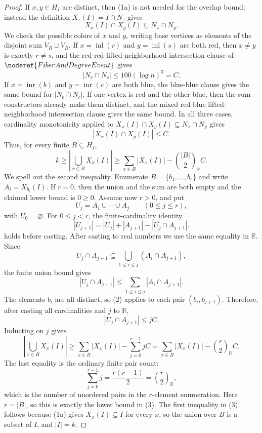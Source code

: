 \begin{proof}
If \(x,y\in H_I\) are distinct, then (1a) is not needed for the overlap
bound; instead the definition \(X_z(I)=I\cap N_z\) gives
\[
X_x(I)\cap X_y(I)\subseteq N_x\cap N_y.
\]
We check the possible colors of \(x\) and \(y\), writing base vertices as
elements of the disjoint sum \(V_R\sqcup V_B\).  If
\(x=\operatorname{inl}(r)\) and \(y=\operatorname{inl}(s)\) are both red, then
\(x\ne y\) is exactly \(r\ne s\), and the red-red lifted-neighborhood
intersection clause of \(\noderef{FiberAndDegreeEvent}\) gives
\[
|N_r\cap N_s|\le 100(\log n)^3=C.
\]
If \(x=\operatorname{inr}(b)\) and \(y=\operatorname{inr}(c)\) are both blue,
the blue-blue clause gives the same bound for \(|N_b\cap N_c|\).  If one
vertex is red and the other blue, then the sum constructors already make them
distinct, and the mixed red-blue lifted-neighborhood intersection clause gives
the same bound.  In all three cases, cardinality monotonicity applied to
\(X_x(I)\cap X_y(I)\subseteq N_x\cap N_y\) gives
\[
|X_x(I)\cap X_y(I)|\le C. \tag{2}
\]
Thus, for every finite \(B\subseteq H_I\),
\[
k\ge\left|\bigcup_{x\in B}X_x(I)\right|
\ge \sum_{x\in B}|X_x(I)|
  -\binom{|B|}{2}_{\mathbb R}C. \tag{3}
\]
We spell out the second inequality.  Enumerate \(B=\{b_1,\ldots,b_r\}\) and
write \(A_i=X_{b_i}(I)\).  If \(r=0\), then the union and the sum are both
empty and the claimed lower bound is \(0\ge0\).  Assume now \(r>0\), and put
\[
U_j=A_1\cup\cdots\cup A_j\qquad (0\le j\le r),
\]
with \(U_0=\varnothing\).  For \(0\le j<r\), the finite-cardinality identity
\[
|U_{j+1}|=|U_j|+|A_{j+1}|-|U_j\cap A_{j+1}|.
\]
holds before casting.  After casting to real numbers we use the same equality
in \(\mathbb R\).  Since
\[
U_j\cap A_{j+1}\subseteq
\bigcup_{1\le i\le j}(A_i\cap A_{j+1}),
\]
the finite union bound gives
\[
|U_j\cap A_{j+1}|
\le\sum_{1\le i\le j}|A_i\cap A_{j+1}|.
\]
The elements \(b_i\) are all distinct, so (2) applies to each pair
\((b_i,b_{j+1})\).  Therefore, after casting all cardinalities and \(j\) to
\(\mathbb R\),
\[
|U_j\cap A_{j+1}|
\le jC.
\]
Inducting on \(j\) gives
\[
\left|\bigcup_{x\in B}X_x(I)\right|
\ge
\sum_{x\in B}|X_x(I)|
-
\sum_{j=0}^{r-1} jC
=
\sum_{x\in B}|X_x(I)|
-\binom r2_{\mathbb R}C.
\]
The last equality is the ordinary finite pair count:
\[
\sum_{j=0}^{r-1}j=\frac{r(r-1)}2=\binom r2_{\mathbb R},
\]
which is the number of unordered pairs in the \(r\)-element enumeration.
Here \(r=|B|\), so this is exactly the lower bound in (3).  The first
inequality in (3) follows because (1a) gives \(X_x(I)\subseteq I\) for every
\(x\), so the union over \(B\) is a subset of \(I\), and \(|I|=k\).


\end{proof}
